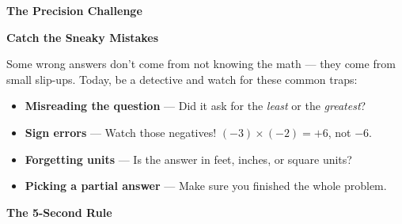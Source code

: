 \clearpage
\thispagestyle{empty}
{\sffamily

\begin{center}
{\fontsize{22}{26}\selectfont\bfseries\color{funPurple} \faSearchPlus\hspace{3mm}The Precision Challenge\hspace{3mm}\faSearchPlus}

\vspace{2mm}
{\color{funGray}\hrulefill}
\end{center}

\vspace{3mm}

\begin{tcolorbox}[
    enhanced,
    colback=funPurpleLight,
    colframe=funPurple!50,
    arc=10pt,
    boxrule=1.5pt,
    left=6mm, right=6mm, top=5mm, bottom=5mm,
]
{\large\bfseries\color{funPurpleDark} \faEye\hspace{2mm}Catch the Sneaky Mistakes}

\vspace{2mm}

Some wrong answers don't come from not knowing the math — they come from small slip-ups. Today, be a detective and watch for these common traps:

\vspace{3mm}

\begin{itemize}[leftmargin=6mm, itemsep=3pt]
    \item[\textcolor{funPurple}{\faExclamationTriangle}] \textbf{Misreading the question} — Did it ask for the \textit{least} or the \textit{greatest}?
    \item[\textcolor{funPurple}{\faExclamationTriangle}] \textbf{Sign errors} — Watch those negatives! $(-3) \times (-2) = +6$, not $-6$.
    \item[\textcolor{funPurple}{\faExclamationTriangle}] \textbf{Forgetting units} — Is the answer in feet, inches, or square units?
    \item[\textcolor{funPurple}{\faExclamationTriangle}] \textbf{Picking a partial answer} — Make sure you finished the whole problem.
\end{itemize}
\end{tcolorbox}

\vspace{3mm}

\begin{tcolorbox}[
    enhanced,
    colback=funYellowLight,
    colframe=funYellow!60,
    arc=10pt,
    boxrule=1pt,
    left=6mm, right=6mm, top=4mm, bottom=4mm,
]
{\bfseries\color{funYellowDark} \faLightbulb\hspace{2mm}The 5-Second Rule}


\end{tcolorbox}}
